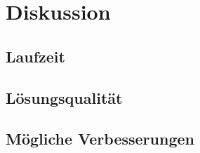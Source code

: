 
\chapter{Diskussion}\label{chapter:diskussion}
\section{Laufzeit}
\section{Lösungsqualität}
\section{Mögliche Verbesserungen}

